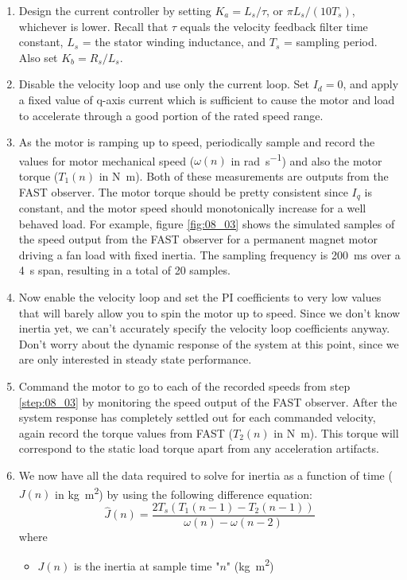 \begin{enumerate}
\item Design the current controller by setting $K_a = L_s/\tau$, or $\pi L_s/(10T_s)$, whichever is lower.  Recall that $\tau$ equals the velocity feedback filter time constant, $L_s$ = the stator winding inductance, and $T_s$ = sampling period.  Also set $K_b = R_s/L_s$.

\item Disable the velocity loop and use only the current loop.  Set $I_d =0$, and apply a fixed value of q-axis current which is sufficient to cause the motor and load to accelerate through a good portion of the rated speed range.

\item \label{step:08_03} As the motor is ramping up to speed, periodically sample and record the values for motor mechanical speed ($\omega(n)$ in \unit{\radian\per\second}) and also the motor torque ($T_1(n)$ in \unit{\newton\meter}).  Both of these measurements are outputs from the FAST observer.  The motor torque should be pretty consistent since $I_q$ is constant, and the motor speed should monotonically increase for a well behaved load.  For example, figure \ref{fig:08_03} shows the simulated samples of the speed output from the FAST observer for a permanent magnet motor driving a fan load with fixed inertia.  The sampling frequency is \qty{200}{\milli\second} over a \qty{4}{\second} span, resulting in a total of 20 samples.
\item Now enable the velocity loop and set the PI coefficients to very low values that will barely allow you to spin the motor up to speed.  Since we don’t know inertia yet, we can’t accurately specify the velocity loop coefficients anyway.  Don’t worry about the dynamic response of the system at this point, since we are only interested in steady state performance.

\item Command the motor to go to each of the recorded speeds from step \ref{step:08_03} by monitoring the speed output of the FAST observer.  After the system response has completely settled out for each commanded velocity, again record the torque values from FAST ($T_2(n)$ in \unit{\newton\meter}).  This torque will correspond to the static load torque apart from any acceleration artifacts.

\item We now have all the data required to solve for inertia as a function of time ($J(n)$ in \unit{\kg\m\squared}) by using the following difference equation:
\begin{equation}\label{eq:8_1}
    \hat J(n) = \frac{2 T_s \left(T_1(n-1) - T_2 (n-1)\right)}{\omega(n)-\omega(n-2)}
\end{equation}
where
\begin{itemize}
    \item $J(n)$ is the inertia at sample time "$n$" (\unit{\kg\m\squared})


\end{itemize}
\end{enumerate}
